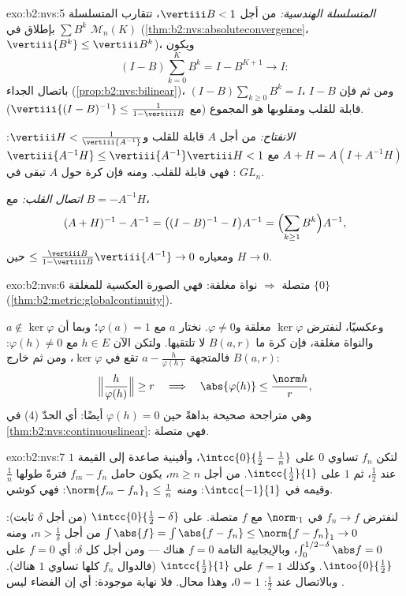 \begin{solution}{exo:b2:nvs:5}
\emph{المتسلسلة الهندسية:} من أجل $\vertiii B < 1$، تتقارب المتسلسلة $\sum
B^k$ بإطلاق في  $\mathcal{M}_n(K)$
(\cref{thm:b2:nvs:absoluteconvergence}، $\vertiii{B^k} \leq
\vertiii B^k$)، ويكون
\[
(I - B)\sum_{k=0}^{K} B^k = I - B^{K+1} \longrightarrow I :
\]
باتصال الجداء
(\cref{prop:b2:nvs:bilinear})، $(I - B)\sum_{k\geq0} B^k = I$، ومن ثم فإن
$I - B$ قابلة للقلب ومقلوبها هو المجموع (مع
$\vertiii{(I-B)^{-1}} \leq \frac{1}{1 - \vertiii B}$).

\emph{الانفتاح:} من أجل $A$ قابلة للقلب و$\vertiii H <
\frac{1}{\vertiii{A^{-1}}}$: $A + H = A(I + A^{-1}H)$ مع
$\vertiii{A^{-1}H} \leq \vertiii{A^{-1}}\vertiii H < 1$: فهي قابلة للقلب.
ومنه فإن كرة حول $A$ تبقى في $GL_n$.

\emph{اتصال القلب:} مع $B = -A^{-1}H$،
\[
(A + H)^{-1} - A^{-1} = \bigl((I - B)^{-1} - I\bigr)A^{-1}
= \Bigl(\sum_{k \geq 1} B^k\Bigr) A^{-1},
\]
ومعياره $\leq \frac{\vertiii B}{1 - \vertiii B}\vertiii{A^{-1}}
\to 0$ حين $H \to 0$.
\end{solution}

\begin{solution}{exo:b2:nvs:6}
متصلة $\Rightarrow$ نواة مغلقة: فهي الصورة العكسية للمغلقة
$\{0\}$ (\cref{thm:b2:metric:globalcontinuity}).

وعكسيًا، لنفترض $\ker\varphi$ مغلقة و$\varphi \neq 0$. نختار
$a$ مع $\varphi(a) = 1$؛ وبما أن $a \notin \ker\varphi$ والنواة
مغلقة، فإن كرة ما $B(a, r)$ لا تلتقيها. ولتكن الآن $h \in E$
مع $\varphi(h) \neq 0$: فالمتجهة $a - \frac{h}{\varphi(h)}$
تقع في $\ker\varphi$، ومن ثم خارج $B(a, r)$:
\[
\Bigl\Vert \frac{h}{\varphi(h)} \Bigr\Vert \geq r
\quad\Longrightarrow\quad
\abs{\varphi(h)} \leq \frac{\norm h}{r},
\]
وهي متراجحة صحيحة بداهةً حين $\varphi(h) = 0$ أيضًا: أي الحدّ
(4) في \cref{thm:b2:nvs:continuouslinear}: فهي متصلة.
\end{solution}

\begin{solution}{exo:b2:nvs:7}
لتكن $f_n$ تساوي $0$ على $\intcc{0}{\frac12 - \frac1n}$، وأفينية صاعدة إلى
القيمة $1$ عند $\frac12$، ثم $1$ على $\intcc{\frac12}{1}$. من أجل $m
\geq n$، يكون حامل $f_m - f_n$ فترةً طولها
$\frac1n$ وقيمه في $\intcc{-1}{1}$: ومنه $\norm{f_m - f_n}_1 \leq
\frac1n$: فهي كوشي.

لنفترض $f_n \to f$ في $\norm\cdot_1$ مع $f$ متصلة. على
$\intcc{0}{\frac12 - \delta}$ (من أجل $\delta$ ثابت): $\int \abs{f} =
\int\abs{f - f_n} \leq \norm{f - f_n}_1 \to 0$ من أجل $n >
\frac1\delta$، ومنه $\int_0^{1/2 - \delta}\abs f = 0$، وبالإيجابية
التامة $f = 0$ هناك --- ومن أجل كل $\delta$: أي $f = 0$ على
$\intoo{0}{\frac12}$. وكذلك $f = 1$ على $\intcc{\frac12}{1}$
(فالدوال $f_n$ كلها تساوي $1$ هناك). وبالاتصال عند $\frac12$: $0 =
1$، وهذا محال. فلا نهاية موجودة: أي إن الفضاء ليس .
\end{solution}

